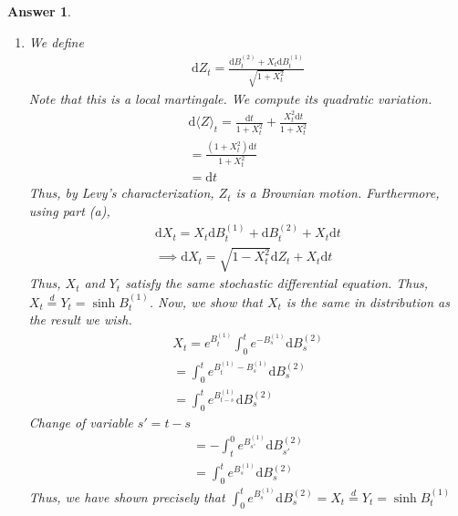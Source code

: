 \documentclass[12pt]{article}
\theoremstyle{colon}
\newtheorem*{answer}{Answer}
\begin{document}
\begin{answer}
\begin{enumerate}[label=\alph*)]
    \item We define
      \begin{gather*}
        \text{d} Z_t = \frac{\text{d} B_t^{(2)} + X_t \text{d} B_t^{(1)}}{\sqrt{1 + X_t^2}}
      \end{gather*}
      Note that this is a local martingale. We compute its quadratic variation.
      \begin{gather*}
        \text{d} \langle Z \rangle_t = \frac{\text{d} t}{1 + X_t^2} + \frac{X_t^2 \text{d} t}{1 + X_t^2} \\
        = \frac{ (1 + X_t^2) \text{d} t}{1 + X_t^2} \\
        = \text{d} t
      \end{gather*}
      Thus, by Levy's characterization, $Z_t$ is a Brownian motion. Furthermore, using part (a),
      \begin{gather*}
        \text{d} X_t = X_t \text{d} B_t^{(1)} + \text{d} B_t^{(2)} + X_t \text{d} t \\
        \implies \text{d} X_t = \sqrt{1 - X_t^2} \text{d} Z_t + X_t \text{d} t
      \end{gather*}
      Thus, $X_t$ and $Y_t$ satisfy the same stochastic differential equation. Thus, $X_t \stackrel{d}{=} Y_t = \sinh B_t^{(1)}$. Now, we show that $X_t$ is the same in distribution as the result we wish.
      \begin{gather*}
        X_t = e^{B_t^{(1)}} \int_0^t e^{-B_s^{(1)}} \text{d} B_s^{(2)} \\
        = \int_0^t e^{B_t^{(1)}-B_s^{(1)}} \text{d} B_s^{(2)} \\
        = \int_0^t e^{B_{t-s}^{(1)}} \text{d} B_s^{(2)}
      \end{gather*}
      Change of variable $s' = t - s$
      \begin{gather*}
        = - \int_t^0 e^{B_{s'}^{(1)}} \text{d} B_{s'}^{(2)} \\
        = \int_0^t e^{B_{s}^{(1)}} \text{d} B_{s}^{(2)}
      \end{gather*}
      Thus, we have shown precisely that $\int_0^t e^{B_s^{(1)}} \text{d} B_s^{(2)} = X_t \stackrel{d}{=} Y_t = \sinh B_t^{(1)}$
  \end{enumerate}
\end{answer}
\end{document}
